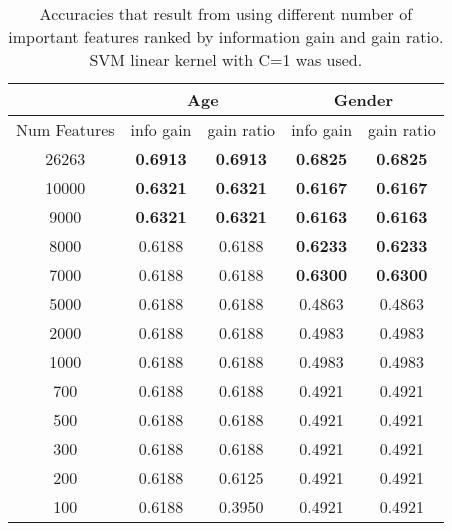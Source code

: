 \documentclass[a4paper]{llncs}
\begin{document}

\begin{table}[!htbp]
\centering
\begin{tabular}{|c|c|c|c|c|}
\hline
                                   & \multicolumn{2}{c|}{Age} & \multicolumn{2}{c|}{Gender} \\ \hline
\multicolumn{1}{|l|}{Num Features} & info gain  & gain ratio  & info gain    & gain ratio   \\ \hline
26263                              & \textbf{0.6913}     & \textbf{0.6913}      & \textbf{0.6825}       & \textbf{0.6825}       \\ \hline
10000                              & \textbf{0.6321}     & \textbf{0.6321}      & \textbf{0.6167}       & \textbf{0.6167}       \\ \hline
9000                               & \textbf{0.6321}     & \textbf{0.6321}      & \textbf{0.6163}       & \textbf{0.6163}       \\ \hline
8000                               & 0.6188     & 0.6188      & \textbf{0.6233}       & \textbf{0.6233}       \\ \hline
7000                               & 0.6188     & 0.6188      & \textbf{0.6300}       & \textbf{0.6300}       \\ \hline
5000                               & 0.6188     & 0.6188      & 0.4863       & 0.4863       \\ \hline
2000                               & 0.6188     & 0.6188      & 0.4983       & 0.4983       \\ \hline
1000                               & 0.6188     & 0.6188      & 0.4983       & 0.4983       \\ \hline
700                                & 0.6188     & 0.6188      & 0.4921       & 0.4921       \\ \hline
500                                & 0.6188     & 0.6188      & 0.4921       & 0.4921       \\ \hline
300                                & 0.6188     & 0.6188      & 0.4921       & 0.4921       \\ \hline
200                                & 0.6188     & 0.6125      & 0.4921       & 0.4921       \\ \hline
100                                & 0.6188     & 0.3950      & 0.4921       & 0.4921       \\ \hline
\end{tabular}
\caption{Accuracies that result from using different number of important features ranked by information gain and gain ratio. SVM linear kernel with C=1 was used.}
\label{table:ChoosingNumFeatures}
\end{table}
\end{document}
